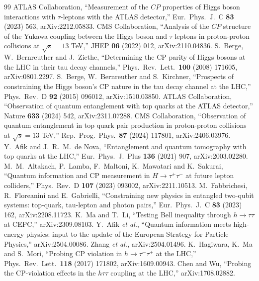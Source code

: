 \documentclass[paper=a4,fontsize=10pt,jafontsize=10pt,line_length=44zw,number_of_lines=46]{jlreq}
\begin{document}
\begin{thebibliography}{99}
 ATLAS Collaboration, ``Measurement of the $CP$ properties of Higgs boson interactions with $\tau$-leptons with the ATLAS detector,'' Eur.\ Phys.\ J.\ C \textbf{83} (2023) 563, arXiv:2212.05833.
 CMS Collaboration, ``Analysis of the $CP$ structure of the Yukawa coupling between the Higgs boson and $\tau$ leptons in proton-proton collisions at $\sqrt s=13$ TeV,'' JHEP \textbf{06} (2022) 012, arXiv:2110.04836.
 S.~Berge, W.~Bernreuther and J.~Ziethe, ``Determining the CP parity of Higgs bosons at the LHC in their tau decay channels,'' Phys.\ Rev.\ Lett.\ \textbf{100} (2008) 171605, arXiv:0801.2297.
 S.~Berge, W.~Bernreuther and S.~Kirchner, ``Prospects of constraining the Higgs boson's CP nature in the tau decay channel at the LHC,'' Phys.\ Rev.\ D \textbf{92} (2015) 096012, arXiv:1510.03850.
 ATLAS Collaboration, ``Observation of quantum entanglement with top quarks at the ATLAS detector,'' Nature \textbf{633} (2024) 542, arXiv:2311.07288.
 CMS Collaboration, ``Observation of quantum entanglement in top quark pair production in proton-proton collisions at $\sqrt s=13$ TeV,'' Rep.\ Prog.\ Phys.\ \textbf{87} (2024) 117801, arXiv:2406.03976.
 Y.~Afik and J.~R.~M.~de Nova, ``Entanglement and quantum tomography with top quarks at the LHC,'' Eur.\ Phys.\ J.\ Plus \textbf{136} (2021) 907, arXiv:2003.02280.
 M.~M.~Altakach, P.~Lamba, F.~Maltoni, K.~Mawatari and K.~Sakurai, ``Quantum information and CP measurement in $H\to\tau^+\tau^-$ at future lepton colliders,'' Phys.\ Rev.\ D \textbf{107} (2023) 093002, arXiv:2211.10513.
 M.~Fabbrichesi, R.~Floreanini and E.~Gabrielli, ``Constraining new physics in entangled two-qubit systems: top-quark, tau-lepton and photon pairs,'' Eur.\ Phys.\ J.\ C \textbf{83} (2023) 162, arXiv:2208.11723.
 K.~Ma and T.~Li, ``Testing Bell inequality through $h\to\tau\tau$ at CEPC,'' arXiv:2309.08103.
 Y.~Afik \textit{et al.}, ``Quantum information meets high-energy physics: input to the update of the European Strategy for Particle Physics,'' arXiv:2504.00086.
 Zhang \textit{et al.}, arXiv:2504.01496.
 K.~Hagiwara, K.~Ma and S.~Mori, ``Probing CP violation in $h\to\tau^-\tau^+$ at the LHC,'' Phys.\ Rev.\ Lett.\ \textbf{118} (2017) 171802, arXiv:1609.00943.
 Chen and Wu, ``Probing the CP-violation effects in the $h\tau\tau$ coupling at the LHC,'' arXiv:1708.02882.

\end{thebibliography}
\end{document}
